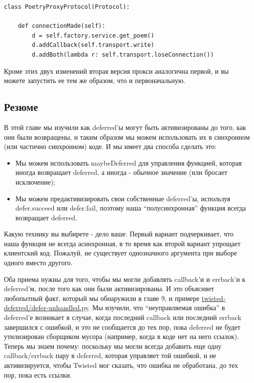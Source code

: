 \begin{scriptsize}\begin{verbatim}
class PoetryProxyProtocol(Protocol):

    def connectionMade(self):
        d = self.factory.service.get_poem()
        d.addCallback(self.transport.write)
        d.addBoth(lambda r: self.transport.loseConnection())

\end{verbatim}\end{scriptsize}


Кроме этих двух изменений вторая версия прокси аналогична первой, 
и вы можете запустить ее тем же образом, что и первоначальную.


\subsection{Резюме}


В этой главе мы изучили как deferred'ы могут быть активизированы 
до того, как они были возвращены, и таким образом мы можем 
использовать их в синхронном (или частично синхронном) коде. 
И мы имеет два способа сделать это: 

\begin{itemize}

\item Мы можем использовать maybeDeferred для управления 
функцией, которая иногда возвращает deferred, а иногда - 
обычное значение (или бросает исключение);

\item Мы можем предактивизировать свои собственные 
deferred'ы, используя defer.succeed или defer.fail, 
поэтому наша ``полусинхронная'' функция всегда возвращает 
deferred.

\end{itemize}

Какую технику вы выбирете - дело ваше.
Первый вариант подчеркивает, что 
наша функция не всегда асинхронная, в то время 
как второй вариант упрощает клиентский код. 
Пожалуй, не существует однозначного аргумента 
при выборе одного вместо другого. 


Оба приема нужны для того, 
чтобы мы могли добавлять callback'и и errback'и к 
deferred'м, после того как они были активизированы. И 
это объясняет любопытный факт, который мы обнаружили 
в главе 9, и примере \href{http://github.com/jdavisp3/twisted-intro/blob/master/twisted-deferred/defer-unhandled.py#L1}{twisted-deferred/defer-unhandled.py}. Мы изучили, что 
``неуправляемая ошибка'' в deferred'е возникает в случае, когда последний  
callback или последний errback завершился с ошибкой, и это не сообщается 
до тех пор, пока deferred не будет утилизирован сборщиком мусора (например, 
когда в коде нет на него ссылок). 
Теперь мы знаем почему: поскольку мы могли всегда 
добавить еще одну callback/errback пару в deferred, 
которая управляет той ошибкой, и не активизируется, 
чтобы Twisted мог сказать, что ошибка не обработана, 
до тех пор, пока есть ссылки.


